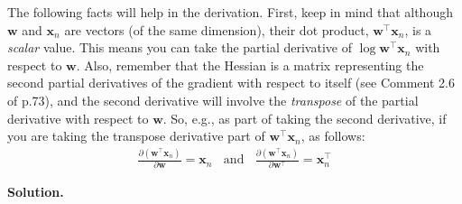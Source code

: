 \documentclass[10pt]{article}
\begin{document}
\begin{itemize}
The following facts will help in the derivation.  First, keep in mind that although $\mathbf{w}$ and $\mathbf{x}_n$ are vectors (of the same dimension), their dot product, $\mathbf{w}^\top\mathbf{x}_n$, is a {\em scalar} value.  This means you can take the partial derivative of $\log \mathbf{w}^\top\mathbf{x}_n$ with respect to $\mathbf{w}$.  Also, remember that the Hessian is a matrix representing the second partial derivatives of the gradient with respect to itself (see Comment 2.6 of p.73), and the second derivative will involve the {\em transpose} of the partial derivative with respect to $\mathbf{w}$.  So, e.g., as part of taking the second derivative, if you are taking the transpose derivative part of $\mathbf{w}^\top\mathbf{x}_n$, as follows:
\begin{eqnarray*}
\frac{\partial (\mathbf{w}^\top \mathbf{x}_n)}{\partial \mathbf{w}} = \mathbf{x}_n
~~~~\mathrm{and}~~~~
\frac{\partial (\mathbf{w}^\top \mathbf{x}_n)}{\partial \mathbf{w}^\top} = \mathbf{x}_n^\top
\end{eqnarray*}

{\bf Solution.} %


\end{itemize}
\end{document}
